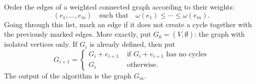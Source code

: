 \begin{page}

\begin{thm}
Order the edges of a weighted connected graph according to their weights:
\[
(e_1, \ldots, e_m) \quad \text{such that} \quad \omega(e_1) \le \cdots \le \omega(e_m).
\]
Going through this list, mark an edge if it does not create a cycle together with the previously marked edges.
More exactly, put $G_0 = (V, \emptyset)$: the graph with isolated vertices only.
If $G_i$ is already defined, then put
\[
G_{i+1} =
\begin{cases}
G_i + e_{i+1} &\text{ if } G_i + e_{i+1} \text{ has no cycles}\\
G_i &\text{ otherwise.}
\end{cases}
\]
The output of the algorithm is the graph $G_m$.
\end{thm}

\end{page}

